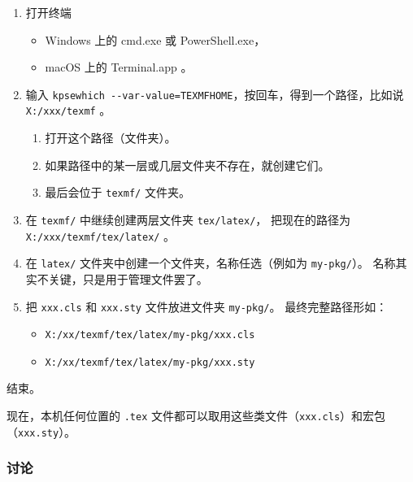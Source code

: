 \documentclass[../Main/thesis.tex]{subfiles}
\begin{document}
\begin{enumerate}
\item
  打开终端

  \begin{itemize}
  \item
    Windows 上的 cmd.exe 或 PowerShell.exe，
  \item
    macOS 上的 Terminal.app 。
  \end{itemize}
\item
  输入
  \texttt{kpsewhich\ -\/-var-value=TEXMFHOME}，按回车，得到一个路径，比如说
  \texttt{X:/xxx/texmf} 。

  \begin{enumerate}
  \def\labelenumii{\arabic{enumii}.}
  \item
    打开这个路径（文件夹）。
  \item
    如果路径中的某一层或几层文件夹不存在，就创建它们。
  \item
    最后会位于 \texttt{texmf/} 文件夹。
  \end{enumerate}
\item
  在 \texttt{texmf/} 中继续创建两层文件夹 \texttt{tex/latex/}，
  把现在的路径为 \texttt{X:/xxx/texmf/tex/latex/} 。
\item
  在 \texttt{latex/} 文件夹中创建一个文件夹，名称任选（例如为
  \texttt{my-pkg/}）。 名称其实不关键，只是用于管理文件罢了。
\item
  把 \texttt{xxx.cls} 和 \texttt{xxx.sty} 文件放进文件夹
  \texttt{my-pkg/}。 最终完整路径形如：

  \begin{itemize}
  \item
    \texttt{X:/xx/texmf/tex/latex/my-pkg/xxx.cls}
  \item
    \texttt{X:/xx/texmf/tex/latex/my-pkg/xxx.sty}
  \end{itemize}
\end{enumerate}

结束。

现在，本机任何位置的 \texttt{.tex}
文件都可以取用这些类文件（\texttt{xxx.cls}）和宏包（\texttt{xxx.sty}）。

\subsubsection{讨论}
\end{document}
